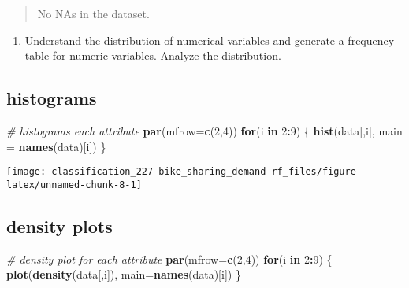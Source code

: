 \documentclass[]{book}
\newenvironment{Shaded}{\begin{snugshade}}{\end{snugshade}}
\newcommand{\CommentTok}[1]{\textcolor[rgb]{0.56,0.35,0.01}{\textit{#1}}}
\newcommand{\ControlFlowTok}[1]{\textcolor[rgb]{0.13,0.29,0.53}{\textbf{#1}}}
\newcommand{\DataTypeTok}[1]{\textcolor[rgb]{0.13,0.29,0.53}{#1}}
\newcommand{\DecValTok}[1]{\textcolor[rgb]{0.00,0.00,0.81}{#1}}
\newcommand{\KeywordTok}[1]{\textcolor[rgb]{0.13,0.29,0.53}{\textbf{#1}}}
\newcommand{\NormalTok}[1]{#1}
\newcommand{\OperatorTok}[1]{\textcolor[rgb]{0.81,0.36,0.00}{\textbf{#1}}}
\providecommand{\tightlist}{%
  \setlength{\itemsep}{0pt}\setlength{\parskip}{0pt}}
\begin{document}
\begin{quote}
No NAs in the dataset.
\end{quote}

\begin{enumerate}
\def\labelenumi{\arabic{enumi}.}
\setcounter{enumi}{4}
\tightlist
\item
  Understand the distribution of numerical variables and generate a frequency table for numeric variables. Analyze the distribution.
\end{enumerate}

\hypertarget{histograms}{%
\subsection{histograms}\label{histograms}}

\begin{Shaded}
\begin{Highlighting}[]
\CommentTok{# histograms each attribute}
\KeywordTok{par}\NormalTok{(}\DataTypeTok{mfrow=}\KeywordTok{c}\NormalTok{(}\DecValTok{2}\NormalTok{,}\DecValTok{4}\NormalTok{))}
\ControlFlowTok{for}\NormalTok{(i }\ControlFlowTok{in} \DecValTok{2}\OperatorTok{:}\DecValTok{9}\NormalTok{) \{}
    \KeywordTok{hist}\NormalTok{(data[,i], }\DataTypeTok{main =} \KeywordTok{names}\NormalTok{(data)[i])}
\NormalTok{\}}
\end{Highlighting}
\end{Shaded}

\begin{center}\texttt{[image: classification\_227-bike\_sharing\_demand-rf\_files/figure-latex/unnamed-chunk-8-1]} \end{center}

\hypertarget{density-plots}{%
\subsection{density plots}\label{density-plots}}

\begin{Shaded}
\begin{Highlighting}[]
\CommentTok{# density plot for each attribute}
\KeywordTok{par}\NormalTok{(}\DataTypeTok{mfrow=}\KeywordTok{c}\NormalTok{(}\DecValTok{2}\NormalTok{,}\DecValTok{4}\NormalTok{))}
\ControlFlowTok{for}\NormalTok{(i }\ControlFlowTok{in} \DecValTok{2}\OperatorTok{:}\DecValTok{9}\NormalTok{) \{}
    \KeywordTok{plot}\NormalTok{(}\KeywordTok{density}\NormalTok{(data[,i]), }\DataTypeTok{main=}\KeywordTok{names}\NormalTok{(data)[i])}
\NormalTok{\}}
\end{Highlighting}
\end{Shaded}
\end{document}
